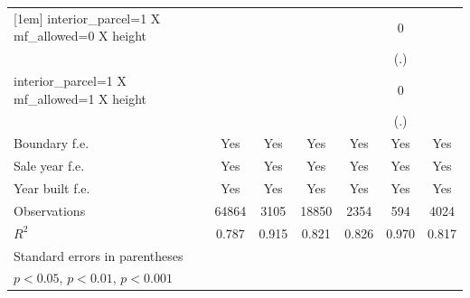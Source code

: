 \begin{table}[htbp]
\begin{tabular}{l*{6}{c}}
[1em]
interior\_parcel=1 X mf\_allowed=0 X height&                     &                     &                     &                     &           0         &                     \\
                    &                     &                     &                     &                     &         (.)         &                     \\
[1em]
interior\_parcel=1 X mf\_allowed=1 X height&                     &                     &                     &                     &           0         &                     \\
                    &                     &                     &                     &                     &         (.)         &                     \\
[1em]
Boundary f.e.       &         Yes         &         Yes         &         Yes         &         Yes         &         Yes         &         Yes         \\
[1em]
Sale year f.e.      &         Yes         &         Yes         &         Yes         &         Yes         &         Yes         &         Yes         \\
[1em]
Year built f.e.     &         Yes         &         Yes         &         Yes         &         Yes         &         Yes         &         Yes         \\
\hline
Observations        &       64864         &        3105         &       18850         &        2354         &         594         &        4024         \\
\(R^{2}\)           &       0.787         &       0.915         &       0.821         &       0.826         &       0.970         &       0.817         \\
\hline\hline
\multicolumn{7}{l}{\footnotesize Standard errors in parentheses}\\
\multicolumn{7}{l}{\footnotesize \sym{*} \(p<0.05\), \sym{**} \(p<0.01\), \sym{***} \(p<0.001\)}\\
\end{tabular}
\end{table}
